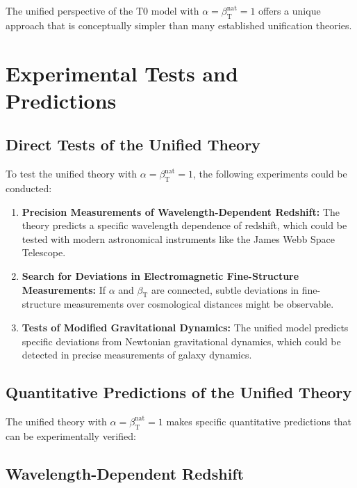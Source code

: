 \documentclass[12pt,a4paper]{article}
\newcommand{\betaT}{\beta_{\text{T}}}
\begin{document}
	The unified perspective of the T0 model with \(\alpha = \betaT^{\text{nat}} = 1\) offers a unique approach that is conceptually simpler than many established unification theories.
	
	\section{Experimental Tests and Predictions}
	
	\subsection{Direct Tests of the Unified Theory}
	
	To test the unified theory with \(\alpha = \betaT^{\text{nat}} = 1\), the following experiments could be conducted:
	
	\begin{enumerate}
		\item \textbf{Precision Measurements of Wavelength-Dependent Redshift:} The theory predicts a specific wavelength dependence of redshift, which could be tested with modern astronomical instruments like the James Webb Space Telescope.
		
		\item \textbf{Search for Deviations in Electromagnetic Fine-Structure Measurements:} If \(\alpha\) and \(\betaT\) are connected, subtle deviations in fine-structure measurements over cosmological distances might be observable.
		
		\item \textbf{Tests of Modified Gravitational Dynamics:} The unified model predicts specific deviations from Newtonian gravitational dynamics, which could be detected in precise measurements of galaxy dynamics.
	\end{enumerate}
	
	\subsection{Quantitative Predictions of the Unified Theory}
	
	The unified theory with \(\alpha = \betaT^{\text{nat}} = 1\) makes specific quantitative predictions that can be experimentally verified:
	
	\subsection{Wavelength-Dependent Redshift}
	
\end{document}
